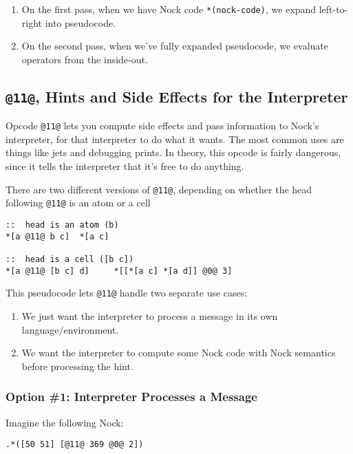 \documentclass[twoside]{article}
\begin{document}
\begin{enumerate}
  \item  On the first pass, when we have Nock code \lstinline[style=inlinecode]{*(nock-code)}, we expand left-to-right into pseudocode.
  \item  On the second pass, when we've fully expanded pseudocode, we evaluate operators from the inside-out.
\end{enumerate}

\subsection{\lstinline[style=inlinecode]{@11@}, Hints and Side Effects for the Interpreter}

Opcode \lstinline[style=inlinecode]{@11@} lets you compute side effects and pass information to Nock's interpreter, for that interpreter to do what it wants. The most common uses are things like jets and debugging prints. In theory, this opcode is fairly dangerous, since it tells the interpreter that it's free to do anything.

There are two different versions of \lstinline[style=inlinecode]{@11@}, depending on whether the head following \lstinline[style=inlinecode]{@11@} is an atom or a cell

\begin{lstlisting}[style=listingcode]
::  head is an atom (b)
*[a @11@ b c]  *[a c]

::  head is a cell ([b c])
*[a @11@ [b c] d]     *[[*[a c] *[a d]] @0@ 3]
\end{lstlisting}

This pseudocode lets \lstinline[style=inlinecode]{@11@} handle two separate use cases:

\begin{enumerate}
  \item  We just want the interpreter to process a message in its own language/environment.
  \item  We want the interpreter to compute some Nock code with Nock semantics before processing the hint.
\end{enumerate}

\subsubsection{Option \#1: Interpreter Processes a Message}

Imagine the following Nock:

\begin{lstlisting}[style=listingcode]
.*([50 51] [@11@ 369 @0@ 2])
\end{lstlisting}
\end{document}

